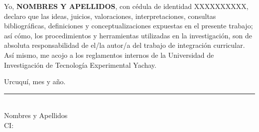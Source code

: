
Yo, \textbf{NOMBRES Y APELLIDOS}, con cédula de identidad XXXXXXXXXX, declaro que las ideas, juicios, valoraciones, interpretaciones, consultas bibliográficas, definiciones y conceptualizaciones expuestas en el presente trabajo; así cómo, los procedimientos y herramientas utilizadas en la investigación, son de absoluta responsabilidad de el/la autor/a del trabajo de integración curricular. Así mismo, me acojo a los reglamentos internos de la Universidad de Investigación de Tecnología Experimental Yachay.

\vspace{0.6cm}

\noindent Urcuquí, mes y año.

\vspace{2.5cm}

\begin{center}
    \rule[0mm]{60mm}{0.1mm} \\
    {Nombres y Apellidos}\\
    CI:
\end{center}

\thispagestyle{empty} %
